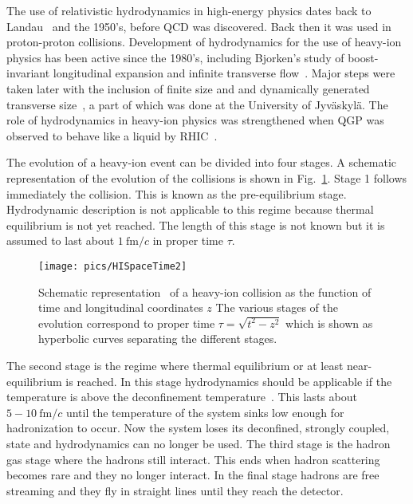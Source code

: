 The use of relativistic hydrodynamics in high-energy physics dates back to Landau~\cite{Landau:1953gs} and the 1950's, before QCD was discovered. Back then it was used in proton-proton collisions. Development of hydrodynamics for the use of heavy-ion physics has been active since the 1980's, including Bjorken's study of boost-invariant longitudinal expansion and infinite transverse flow~\cite{PhysRevD.27.140}. Major steps were taken later with the inclusion of finite size and and dynamically generated transverse size~\cite{Baym:1984sr, PhysRevD.34.794}, a part of which was done at the University of Jyväskylä. The role of hydrodynamics in heavy-ion physics was strengthened when QGP was observed to behave like a liquid by RHIC~\cite{Adcox:2004mh}. 

The evolution of a heavy-ion event can be divided into four stages. A schematic representation of the evolution of the collisions is shown in Fig.~\ref{fig:HISpaceTime}. Stage 1 follows immediately the collision. This is known as the pre-equilibrium stage. Hydrodynamic description is not applicable to this regime because thermal equilibrium is not yet reached. The length of this stage is not known but it is assumed to last about $1\ \mathrm{fm}/c$ in proper time $\tau$. 

\begin{figure}[htb]
\centering
               \texttt{[image: pics/HISpaceTime2]}
        \caption[Schematic representation of a heavy-ion collision]{Schematic representation~\cite{Romatschke:2009im} of a heavy-ion collision as the function of time and longitudinal coordinates $z$ The various stages of the evolution correspond to proper time $\tau=\sqrt{t^2-z^2}$ which is shown as hyperbolic curves separating the different stages.}
        	\label{fig:HISpaceTime}
\end{figure}

The second stage is the regime where thermal equilibrium or at least near-equilibrium is reached. In this stage hydrodynamics should be applicable if the temperature is above the deconfinement temperature~\cite{Romatschke:2009im}. This lasts about $5-10\ \mathrm{fm}/c$ until the temperature of the system sinks low enough for hadronization to occur. Now the system loses its deconfined, strongly coupled, state and hydrodynamics can no longer be used. The third stage is the hadron gas stage where the hadrons still interact. This ends when hadron scattering becomes rare and they no longer interact. In the final stage hadrons are free streaming and they fly in straight lines until they reach the detector.


